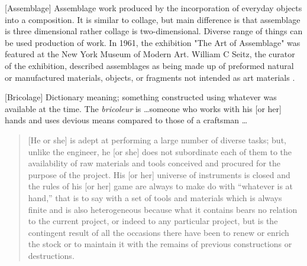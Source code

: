 %
%
[Assemblage] Assemblage work produced by the incorporation of everyday objects into a composition. It is similar to collage, but main difference is that assemblage is three dimensional rather collage is two-dimensional. Diverse range of things can be used production of work. In 1961, the exhibition "The Art of Assemblage" was featured at the New York Museum of Modern Art. William C Seitz, the curator of the exhibition, described assemblages as being made up of preformed natural or manufactured materials, objects, or fragments not intended as art materials \cite{seitz1961art}. 





%
%
[Bricolage] Dictionary meaning; something constructed using whatever was available at the time.  The \textit{bricoleur} is \ldots someone who works with his [or her] hands and uses devious means compared to those of a craftsman \ldots \cite{levi1966savage} 


\begin{quote}
[He or she] is adept at performing a large number of diverse tasks; but, unlike the engineer, he [or she] does not subordinate each of them to the availability of raw materials and tools conceived and procured for the purpose of the project. His [or her] universe of instruments is closed and the rules of his [or her] game are always to make do with “whatever is at hand,” that is to say with a set of tools and materials which is always finite and is also heterogeneous because what it contains bears no relation to the current project, or indeed to any particular project, but is the contingent result of all the occasions there have been to renew or enrich the stock or to maintain it with the remains of previous constructions or destructions.\cite{levi1966savage}
\end{quote}

